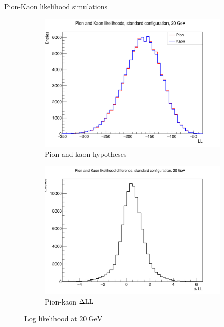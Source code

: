 \documentclass{beamer}
\begin{document}
\begin{frame}{Pion-Kaon likelihood simulations}
  \begin{figure}
    \centering
    \vspace{-0.2cm}
    \begin{subfigure}{0.5\textwidth}
      \includegraphics[width = 1.0\textwidth]{Plots/PionKaonLL20GeVStandard.png}
      \caption{Pion and kaon hypotheses}
    \end{subfigure}%
    \begin{subfigure}{0.5\textwidth}
      \includegraphics[width = 1.0\textwidth]{Plots/PionKaonDLL20GeVStandard.png}
      \caption{Pion-kaon $\Delta{\rm LL}$}
    \end{subfigure}
    \caption{Log likelihood at $\SI{20}{\giga\eV}$}
  \end{figure}
\end{frame}
\end{document}
